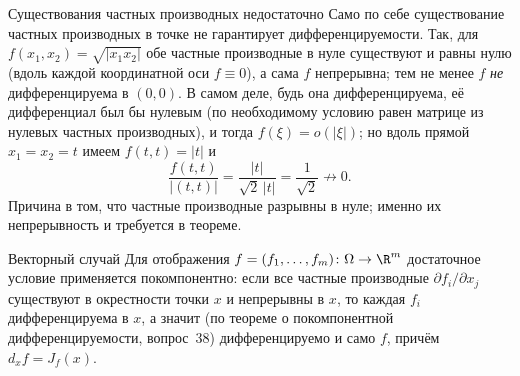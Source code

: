 \begin{Remark}{Существования частных производных недостаточно}{}
	Само по себе существование частных производных в точке не гарантирует дифференцируемости. Так, для $f(x_1,x_2)=\sqrt{|x_1 x_2|}$ обе частные производные в нуле существуют и равны нулю (вдоль каждой координатной оси $f\equiv0$), а сама $f$ непрерывна; тем не менее $f$ \emph{не} дифференцируема в $(0,0)$. В самом деле, будь она дифференцируема, её дифференциал был бы нулевым (по необходимому условию равен матрице из нулевых частных производных), и тогда $f(\xi)=o(|\xi|)$; но вдоль прямой $x_1=x_2=t$ имеем $f(t,t)=|t|$ и
	\[
	\frac{f(t,t)}{|(t,t)|}=\frac{|t|}{\sqrt2\,|t|}=\frac{1}{\sqrt2}\not\to0.
	\]
	Причина в том, что частные производные разрывны в нуле; именно их непрерывность и требуется в теореме.
\end{Remark}

\begin{Remark}{Векторный случай}{}
	Для отображения $f=(f_1,\dots,f_m)\colon\Omega\to\R^m$ достаточное условие применяется покомпонентно: если все частные производные $\partial f_i/\partial x_j$ существуют в окрестности точки $x$ и непрерывны в $x$, то каждая $f_i$ дифференцируема в $x$, а значит (по теореме о покомпонентной дифференцируемости, вопрос~38) дифференцируемо и само $f$, причём $d_xf=J_f(x)$.
\end{Remark}

